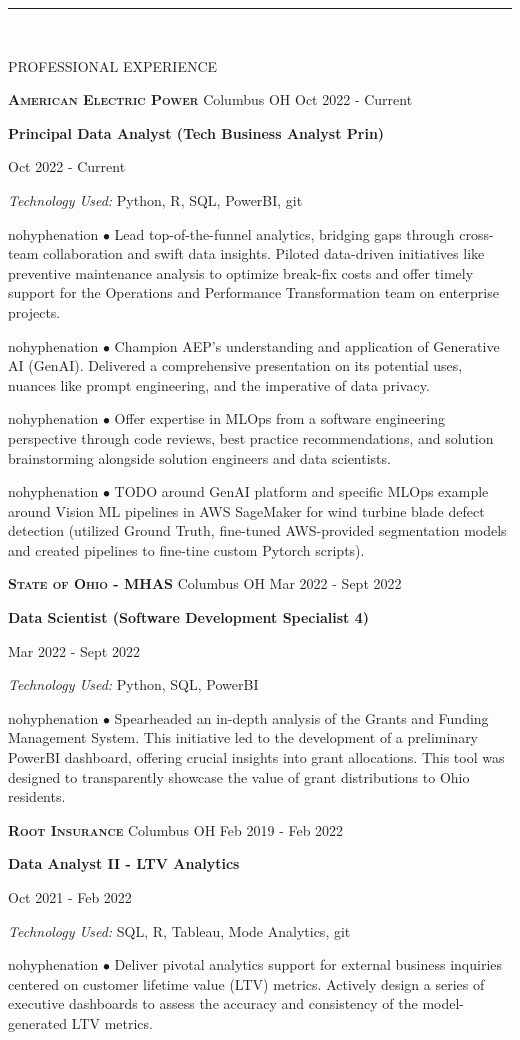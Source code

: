 \documentclass[12pt]{article}
\newcommand{\tab}[1][1cm]{\hspace*{#1}}
\newcommand{\header}[1]{
    \vspace*{-2mm}
    \rule{6.5in}{3pt} \\
    \smallskip
    \begin{large}
	    \textsc{\textcolor{lblue}{#1}}
    \end{large}
    \bigskip
}
\newcommand{\company}[4]{
    \textsc{\textbf{#1}} \tab \small {#2} \hfill \small {#3 {-} #4} \\
    \medskip
}
\newcommand{\position}[4]{
    \tab[0.5cm] \textbf{#1} \hfill {\footnotesize #2 {-} #3 \par}
    \tab[1cm] \textit{Technology Used:} #4 \\
    \vspace*{0.5mm}
}
\newcommand{\bulletpoint}[1]{
  \begin{hyphenrules}{nohyphenation}
  	\hangindent=1.5cm \rightskip=2.35cm \tab[1.1cm] $\bullet$#1 \\
  \end{hyphenrules}
  \medskip
}
\begin{document}
  \begin{flushleft}
    \header{PROFESSIONAL EXPERIENCE}

    \company{American Electric Power}{Columbus OH}{Oct 2022}{Current}
    
    \position{Principal Data Analyst (Tech Business Analyst Prin)}{Oct 2022}{Current}{Python, R, SQL, PowerBI, git}
    \bulletpoint{
    	Lead top-of-the-funnel analytics, bridging gaps through cross-team collaboration and
	swift data insights. Piloted data-driven initiatives like preventive maintenance analysis
	to optimize break-fix costs and offer timely support for the Operations and Performance
	Transformation team on enterprise projects.
    }
    \bulletpoint{
    	Champion AEP's understanding and application of Generative AI (GenAI). Delivered a
	comprehensive presentation on its potential uses, nuances like prompt engineering, and the
	imperative of data privacy.
    }
    \bulletpoint{
    	Offer expertise in MLOps from a software engineering perspective through code reviews,
	best practice recommendations, and solution brainstorming alongside solution engineers and data scientists.
    }
    \bulletpoint{
        TODO around GenAI platform and specific MLOps example around Vision ML pipelines in
        AWS SageMaker for wind turbine blade defect detection (utilized Ground Truth, fine-tuned
        AWS-provided segmentation models and created pipelines to fine-tine custom Pytorch
        scripts).
    }
    \medskip

    \company{State of Ohio - MHAS}{Columbus OH}{Mar 2022}{Sept 2022}
    
    \position{Data Scientist (Software Development Specialist 4)}{Mar 2022}{Sept 2022}{Python, SQL, PowerBI}
    \bulletpoint{
    	Spearheaded an in-depth analysis of the Grants and Funding Management System. This initiative led
	to the development of a preliminary PowerBI dashboard, offering crucial insights into grant allocations.
	This tool was designed to transparently showcase the value of grant distributions to Ohio residents.
    }

    \newpage

    \company{Root Insurance}{Columbus OH}{Feb 2019}{Feb 2022}

    \position{Data Analyst II - LTV Analytics}{Oct 2021}{Feb 2022}{SQL, R, Tableau, Mode Analytics, git}
    \bulletpoint{
	Deliver pivotal analytics support for external business inquiries centered on customer lifetime
	value (LTV) metrics. Actively design a series of executive dashboards to assess the accuracy
	and consistency of the model-generated LTV metrics.
    }


\end{flushleft}
\end{document}
